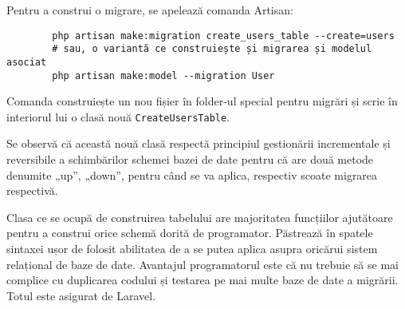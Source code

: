 		Pentru a construi o migrare, se apelează comanda Artisan:
		\begin{verbatim}
		php artisan make:migration create_users_table --create=users
		# sau, o variantă ce construiește și migrarea și modelul asociat
		php artisan make:model --migration User
		\end{verbatim}
		Comanda construiește un nou fișier în folder-ul special pentru migrări și scrie în interiorul lui o clasă nouă \verb|CreateUsersTable|.

		Se observă că această nouă clasă respectă principiul gestionării incrementale și reversibile a schimbărilor schemei bazei de date pentru că are două metode denumite „up”, „down”, pentru când se va aplica, respectiv scoate migrarea respectivă.

		Clasa ce se ocupă de construirea tabelului are majoritatea funcțiilor ajutătoare pentru a construi orice schemă dorită de programator.
		Păstrează în spatele sintaxei ușor de folosit abilitatea de a se putea aplica asupra oricărui sistem relațional de baze de date.
		Avantajul programatorul este că nu trebuie să se mai complice cu duplicarea codului și testarea pe mai multe baze de date a migrării.
		Totul este asigurat de Laravel.
